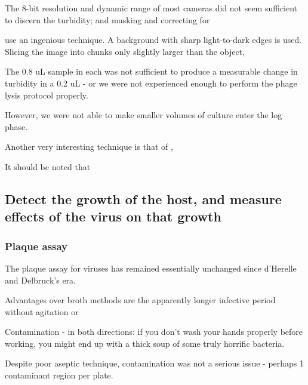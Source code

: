 \documentclass[paper.tex]{subfiles}
\begin{document}
The 8-bit resolution and dynamic range of most cameras did not seem sufficient to discern the turbidity; and masking and correcting for 

\cite{Vision2016} use an ingenious technique. A background with sharp light-to-dark edges is used. Slicing the image into chunks only slightly larger than the object,


The 0.8 uL sample in each was not sufficient to produce a measurable change in turbidity in a 0.2 uL - or we were not experienced enough to perform the phage lysis protocol properly.

However, we were not able to make smaller volumes of culture enter the log phase.




Another very interesting technique is that of \cite{Study2003}, 



























It should be noted that 

\subsection{Detect the growth of the host, and measure effects of the virus on that growth}

\subsubsection{Plaque assay}

The plaque assay for viruses has remained essentially unchanged since d'Herelle and Delbruck's era.

Advantages over broth methods are the apparently longer infective period without agitation or 

Contamination - in both directions: if you don’t wash your hands properly before working, you might end up with a thick soup of some truly horrific bacteria.

Despite poor aseptic technique, contamination was not a serious issue - perhaps 1 contaminant region per plate.
\end{document}
